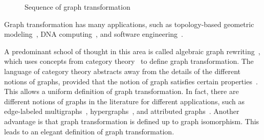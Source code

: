 \begin{figure}[!ht]
{
}
        \caption{Sequence of graph transformation}
        \label{fig:intro_sequence_of_transformation}
    \end{figure}


 Graph transformation has many applications, such as topology-based geometric modeling~\cite{poudret2007topology, belhaouari2014jerboa, bellet2017geometric, pascale2022Geometric_modeling}, DNA computing~\cite{harju2004tutorial_dna_computation}, and software engineering~\cite{heckel2020software_engineers}.
 
 A predominant school of thought in this area is called algebraic graph rewriting~\cite{ehrig1997handbook1,ehrig1999handbook2,ehrig1999handbook3}, which uses concepts from category theory~\cite{pierce1991basic,barr1990category,maclane2013categories} to define graph transformation. 
 The language of category theory abstracts away from the details of the different notions of graphs, provided that the notion of graph satisfies certain properties~\cite{lack2004adhesive,overbeek2023graph}.  
This allows a uniform definition of graph transformation. In fact, there are different notions of graphs in the literature for different applications, such as edge-labeled multigraphs~\cite{konig2018atutorial,corradini1997algebraic}, hypergraphs~\cite{plump1993hypergraph}, and attributed graphs~\cite{ehrig2006fundamentals}. 
 Another advantage is that graph transformation is defined up to graph isomorphism. 
 This leads to an elegant definition of graph transformation. 

